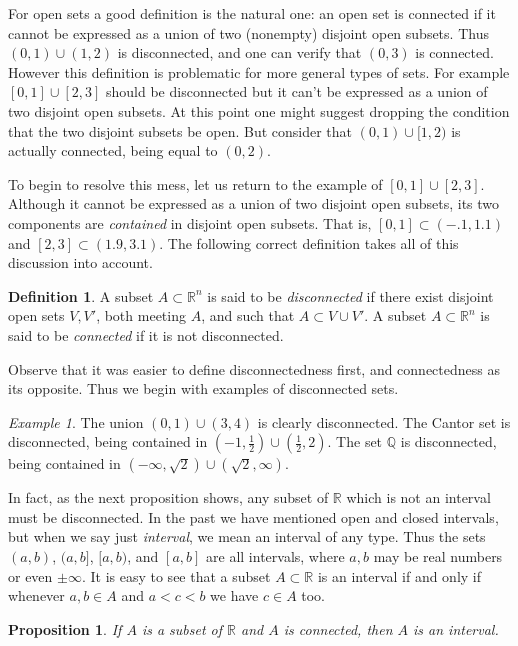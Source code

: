 \documentclass[11pt,oneside]{amsbook}
\newcommand{\QQ}{\mathbb Q}
\newcommand{\RR}{\mathbb R}
\theoremstyle{definition}
\theoremstyle{plain}
\newtheorem{prop}[thm]{Proposition}
\theoremstyle{definition}
\newtheorem{defn}[thm]{Definition}
\theoremstyle{remark}
\newtheorem{example}[thm]{Example}
\numberwithin{equation}{section}
\numberwithin{figure}{section}
\begin{document}
For open sets a good definition is the natural one: an open set is connected if it cannot be expressed as a union of two (nonempty) disjoint open subsets. Thus $(0,1)\cup(1,2)$ is disconnected, and one can verify that $(0,3)$ is connected. However this definition is problematic for more general types of sets. For example $[0,1]\cup[2,3]$ should be disconnected but it can't be expressed as a union of two disjoint open subsets. At this point one might suggest dropping the condition that the two disjoint subsets be open. But consider that $(0,1)\cup[1,2)$ is actually connected, being equal to $(0,2)$.

To begin to resolve this mess, let us return to the example of $[0,1]\cup[2,3]$. Although it cannot be expressed as a union of two disjoint open subsets, its two components are \emph{contained} in disjoint open subsets. That is, $[0,1]\subset(-.1,1.1)$ and $[2,3]\subset(1.9,3.1)$. The following correct definition takes all of this discussion into account. 

\begin{defn}
  A subset $A\subset\RR^n$ is said to be \emph{disconnected} if there exist disjoint open sets $V,V'$, both meeting $A$, and such that $A\subset V\cup V'$. A subset $A\subset\RR^n$ is said to be \emph{connected} if it is not disconnected.
\end{defn}

Observe that it was easier to define disconnectedness first, and connectedness as its opposite. Thus we begin with examples of disconnected sets.

\begin{example}
  The union $(0,1)\cup(3,4)$ is clearly disconnected. The Cantor set is disconnected, being contained in $(-1,\frac12)\cup(\frac12,2)$. The set $\QQ$ is disconnected, being contained in $(-\infty,\sqrt2)\cup(\sqrt2,\infty)$.
\end{example}

In fact, as the next proposition shows, any subset of $\RR$ which is not an interval must be disconnected. In the past we have mentioned open and closed intervals, but when we say just \emph{interval}, we mean an interval of any type. Thus the sets $(a,b)$, $(a,b]$, $[a,b)$, and $[a,b]$ are all intervals, where $a,b$ may be real numbers or even $\pm\infty$. It is easy to see that a subset $A\subset\RR$ is an interval if and only if whenever $a,b\in A$ and $a<c<b$ we have $c\in A$ too.

\begin{prop}
  If $A$ is a subset of $\RR$ and $A$ is connected, then $A$ is an interval.
\end{prop}
\end{document}

